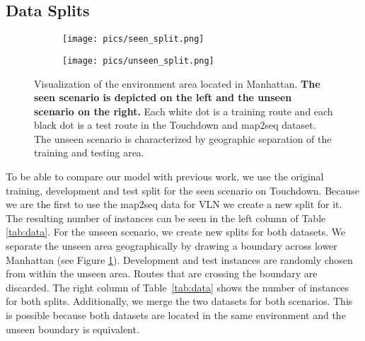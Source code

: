 \documentclass[11pt]{article}
\begin{document}
\subsection{Data Splits}
\label{data_splits}
\begin{figure}
    \centering
    \begin{subfigure}{0.21\textwidth}
        \texttt{[image: pics/seen\_split.png]}
    \end{subfigure}
    \hfill
    \begin{subfigure}{0.21\textwidth}
        \texttt{[image: pics/unseen\_split.png]}
    \end{subfigure}
    \caption{Visualization of the environment area located in Manhattan. \textbf{The seen scenario is depicted on the left and the unseen scenario on the right.} Each white dot is a training route and each black dot is a test route in the Touchdown and map2seq dataset. The unseen scenario is characterized by geographic separation of the training and testing area.}
  \label{fig:splits}
\end{figure}
To be able to compare our model with previous work, we use the original training, development and test split \cite{Chen2018Touchdown} for the seen scenario on Touchdown. Because we are the first to use the map2seq data for VLN we create a new split for it. The resulting number of instances can be seen in the left column of Table \ref{tab:data}. For the unseen scenario, we create new splits for both datasets. We separate the unseen area geographically by drawing a boundary across lower Manhattan (see Figure \ref{fig:splits}). Development and test instances are randomly chosen from within the unseen area. Routes that are crossing the boundary are discarded. The right column of Table~\ref{tab:data} shows the number of instances for both splits. Additionally, we merge the two datasets for both scenarios. This is possible because both datasets are located in the same environment and the unseen boundary is equivalent.
\begin{table}[]
\centering
{}
\caption{Number of instances in the data splits for the seen and unseen scenario of Touchdown and map2seq.}
\label{tab:data}
\end{table}
 
\end{document}
